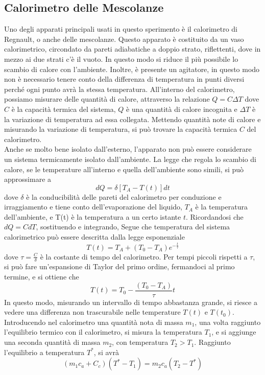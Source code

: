 \documentclass[a4paper]{article}
\begin{document}
\subsection{Calorimetro delle Mescolanze}
Uno degli apparati principali usati in questo sperimento è il calorimetro di Regnault, o anche delle mescolanze. Questo apparato è costituito da un vaso calorimetrico, circondato da pareti adiabatiche a doppio strato, riflettenti, dove in mezzo ai due strati c'è il vuoto. In questo modo si riduce il più possibile lo scambio di calore con l'ambiente. Inoltre, è presente un agitatore, in questo modo non è necessario tenere conto della differenza di temperatura in punti diversi perché ogni punto avrà la stessa temperatura. All'interno del calorimetro, possiamo misurare delle quantità di calore, attraverso la relazione $Q = C\Delta T$
dove $C$ è la capacità termica del sistema, $Q$ è una quantità di calore incognita e $\Delta T$ è la variazione di temperatura ad essa collegata. Mettendo quantità note di calore e misurando la variazione di temperatura, si può trovare la capacità termica $C$ del calorimetro.\\
Anche se molto bene isolato dall'esterno, l'apparato non può essere considerare un sistema termicamente isolato dall'ambiente. La legge che regola lo scambio di calore, se le temperature all'interno e quella dell'ambiente sono simili, si può approssimare a 
\begin{equation}
    dQ = \delta [T_A - T(t)]dt
\end{equation}
dove $\delta$ è la conducibilità delle pareti del calorimetro per conduzione e irraggiamento e tiene conto dell'evaporazione del liquido, $T_A$ è la temperatura dell'ambiente, e T(t) è la temperatura a un certo istante $t$. Ricordandosi che $dQ = CdT$, sostituendo e integrando, Segue che temperatura del sistema calorimetrico può essere descritta dalla legge esponenziale 
\begin{equation}
    T(t) = T_A + (T_0 - T_A) e^{-\frac{t}{\tau}}
\end{equation}
dove $\tau = \frac{C}{\delta}$ è la costante di tempo del calorimetro. Per tempi piccoli rispetti a $\tau$, si può fare un'espansione di Taylor del primo ordine, fermandoci al primo termine, e si ottiene che 
\begin{equation}
    T(t) = T_0 - \frac{(T_0 - T_A)}{\tau}t
\end{equation}
In questo modo, misurando un intervallo di tempo abbastanza grande, si riesce a vedere una differenza non trascurabile nelle temperature $T(t)$ e $T(t_0)$. Introducendo nel calorimetro una quantità nota di massa $m_1$, una volta raggiunto l'equilibrio termico con il calorimetro, si misura la temperatura $T_1$, e si aggiunge una seconda quantità di massa $m_2$, con temperatura $T_2 > T_1$. Raggiunto l'equilibrio a temperatura $T^*$, si avrà
\begin{equation}\label{eq}
    (m_1 c_a + C_c) (T^*-T_1) = m_2 c_a (T_2-T^*)
\end{equation}
\end{document}
